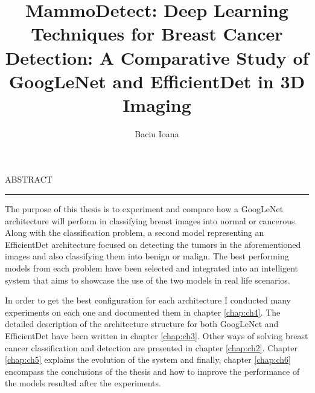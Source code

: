 \documentclass[12pt]{report}
\begin{document}
\title{MammoDetect: Deep Learning Techniques for Breast Cancer Detection: A Comparative Study of GoogLeNet and EfficientDet in 3D Imaging}					   
\author{Baciu Ioana}											
				
\maketitle


\newpage
\thispagestyle{empty}
\mbox{}
\newpage
{} 

\cleardoublepage
ABSTRACT
\vspace{0.5cm}	
\hrule
\vspace{0.5cm}	




The purpose of this thesis is to experiment and compare how a GoogLeNet architecture will perform in classifying breast images into normal or cancerous. Along with the classification problem, a second model representing an EfficientDet architecture focused on detecting the tumors in the aforementioned images and also classifying them into benign or malign. The best performing models from each problem have been selected and integrated into an intelligent system that aims to showcase the use of the two models in real life scenarios. 

In order to get the best configuration for each architecture I conducted many experiments on each one and documented them in chapter \ref{chap:ch4}. The detailed description of the architecture structure for both GoogLeNet and EfficientDet have been written in chapter \ref{chap:ch3}. Other ways of solving breast cancer classification and detection are presented in chapter \ref{chap:ch2}. Chapter \ref{chap:ch5} explains the evolution of the system and finally, chapter \ref{chap:ch6} encompass the conclusions of the thesis and how to improve the performance of the models resulted after the experiments.

\tableofcontents


\newpage
{}













\end{document}
